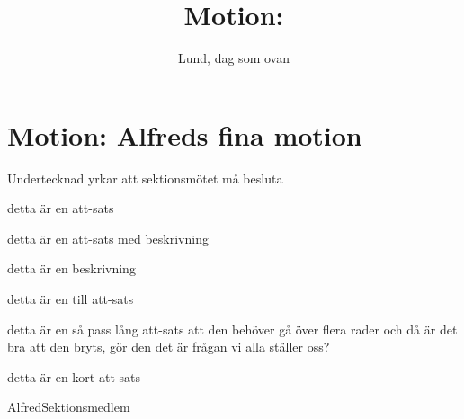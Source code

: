 \documentclass[nopdfbookmarks,a4paper, 11pt, twoside]{article}
\title{Motion: \TITLE}
\newcommand{\TITLE}{Alfreds fina motion} %
\newcommand{\TEXT}{} %
\newcommand{\UNDER}{Undertecknad yrkar att sektionsmötet må besluta}
\newcommand{\ATT}[1]{\item #1}
\newcommand{\ATTDESC}[2]{\item #1 \begin{description} \item #2 \end{description}}
\begin{document}
\section*{Motion: \TITLE}


\TEXT

\UNDER


\begin{attlista}
	\ATT{detta är en att-sats} %
	\ATTDESC{detta är en att-sats med beskrivning}{detta är en beskrivning}
    \ATT{detta är en till att-sats}
    \ATT{detta är en så pass lång att-sats att den behöver gå över flera rader och då är det bra att den bryts, gör den det är frågan vi alla ställer oss?}
    \ATT{detta är en kort att-sats}
\end{attlista}

\signature{Lund, dag som ovan}{Alfred}{Sektionsmedlem}
\end{document}
